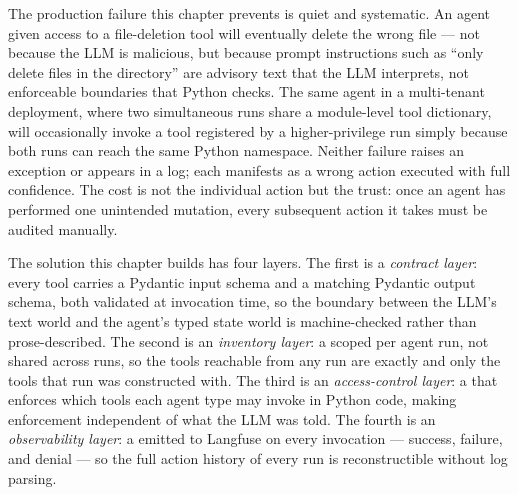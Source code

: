 

The production failure this chapter prevents is quiet and systematic. An
agent given access to a file-deletion tool will eventually delete the wrong
file --- not because the LLM is malicious, but because prompt instructions
such as ``only delete files in the  directory'' are advisory text
that the LLM interprets, not enforceable boundaries that Python checks.
The same agent in a multi-tenant deployment, where two simultaneous runs
share a module-level tool dictionary, will occasionally invoke a tool
registered by a higher-privilege run simply because both runs can reach
the same Python namespace. Neither failure raises an exception or appears
in a log; each manifests as a wrong action executed with full confidence.
The cost is not the individual action but the trust: once an agent has
performed one unintended mutation, every subsequent action it takes must
be audited manually.

The solution this chapter builds has four layers. The first is a
\emph{contract layer}: every tool carries a Pydantic input schema and a
matching Pydantic output schema, both validated at invocation time, so the
boundary between the LLM's text world and the agent's typed state world is
machine-checked rather than prose-described. The second is an
\emph{inventory layer}: a  scoped per agent run, not
shared across runs, so the tools reachable from any run are exactly and
only the tools that run was constructed with. The third is an
\emph{access-control layer}: a  that enforces which
tools each agent type may invoke in Python code, making enforcement
independent of what the LLM was told. The fourth is an
\emph{observability layer}: a  emitted to
Langfuse on every invocation --- success, failure, and denial --- so the
full action history of every run is reconstructible without log parsing.


